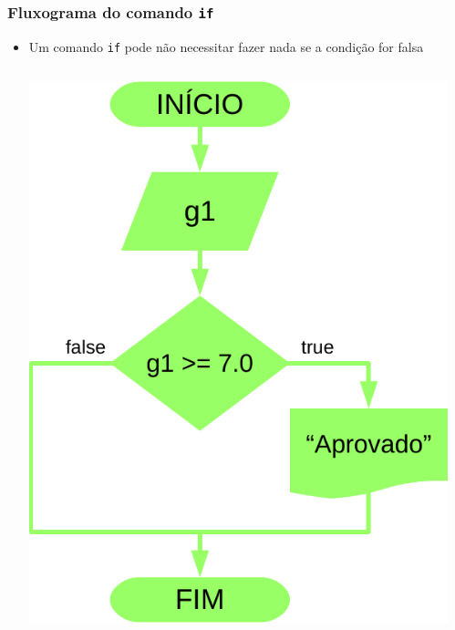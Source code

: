 \documentclass[xcolor={dvipsnames,table},aspectratio=169]{beamer}
\begin{document}
\begin{frame}[fragile]\frametitle{Fluxograma do comando \texttt{if}}
\begin{itemize}
	\item Um comando \texttt{if} pode não necessitar fazer nada se a condição for falsa
\begin{columns}
\begin{column}{0.4\textwidth}
	\begin{center}
	\includegraphics[height=0.6\paperheight]{pucrs-ep-fprog-unidade_03-decisoes-laminas-fluxograma_if.png}
	\end{center}
\end{column}
\begin{column}{0.6\textwidth}
	\footnotesize{\inputminted[bgcolor=cyan!10]{java}{src/Aprovado.java}}
\end{column}
\end{columns}
\end{itemize}
\end{frame}
\end{document}
